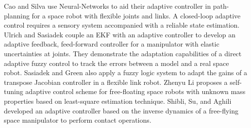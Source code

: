 \documentclass[lettersize,journal]{IEEEtran}
\begin{document}

Cao and Silva use Neural-Networks to aid their adaptive controller in path-planning for a space robot with flexible joints and links\cite{cao2006dynamic}.
A closed-loop adaptive control requires a sensory system accompanied with a reliable state estimation. 
Ulrich and Sasiadek couple an EKF with an adaptive controller\cite{Ulrich2011a} to develop an adaptive feedback, feed-forward controller for a manipulator with elastic uncertainties at joints\cite{Ulrich2014a}. They demonstrate the adaptation capabilities of a direct adaptive fuzzy control to track the errors between a model and a real space robot\cite{Ulrich2011b}. Sasiadek and Green also apply a fuzzy logic system to adapt the gains of a transpose Jacobian controller in a flexible link robot\cite{Green2005}. 
Zhenyu Li proposes a self-tuning adaptive control scheme for free-floating space robots with unknown mass properties based on least-square estimation technique\cite{li2016target}. Shibli, Su, and Aghili developed an adaptive controller based on the inverse dynamics of a free-flying space manipulator to perform contact operations\cite{shibli2006adaptive}{}. 
\end{document}
